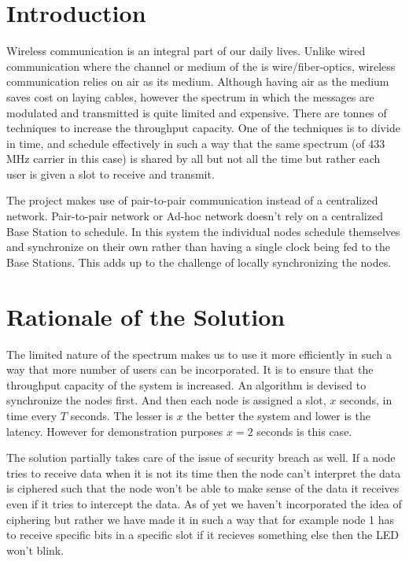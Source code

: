 \documentclass[12pt]{article}
\begin{document}
 \section{Introduction}
 
 Wireless communication is an integral part of our daily lives. Unlike wired communication where the channel or medium of the is wire/fiber-optics, wireless communication relies on air as its medium. Although having air as the medium saves cost on laying cables, however the spectrum in which the messages are modulated and transmitted is quite limited and expensive. There are tonnes of techniques to increase the throughput capacity. One of the techniques is to divide in time, and schedule effectively in such a way that the same spectrum (of 433 MHz carrier in this case) is shared by all but not all the time but rather each user is given a slot to receive and transmit.
 
 The project makes use of pair-to-pair communication instead of a centralized network. Pair-to-pair network or Ad-hoc network doesn't rely on a centralized Base Station to schedule. In this system the individual nodes schedule themselves and synchronize on their own rather than having a single clock being fed to the Base Stations. This adds up to the challenge of locally synchronizing the nodes. 
 
 \section{Rationale of the Solution}
 
 The limited nature of the spectrum makes us to use it more efficiently in such a way that more number of users can be incorporated. It is to ensure that the throughput capacity of the system is increased. An algorithm is devised to synchronize the nodes first. And then each node is assigned a slot, $x$ seconds, in time every $T$ seconds. The lesser is $x$ the better the system and lower is the latency. However for demonstration purposes $x=2$ seconds is this case. 
 
 The solution partially takes care of the issue of security breach as well. If a node tries to receive data when it is not its time then the node can't interpret the data is ciphered such that the node won't be able to make sense of the data it receives even if it tries to intercept the data. As of yet we haven't incorporated the idea of ciphering but rather we have made it in such a way that for example node 1 has to receive specific bits in a specific slot if it recieves something else then the LED won't blink. 
 
\end{document}
